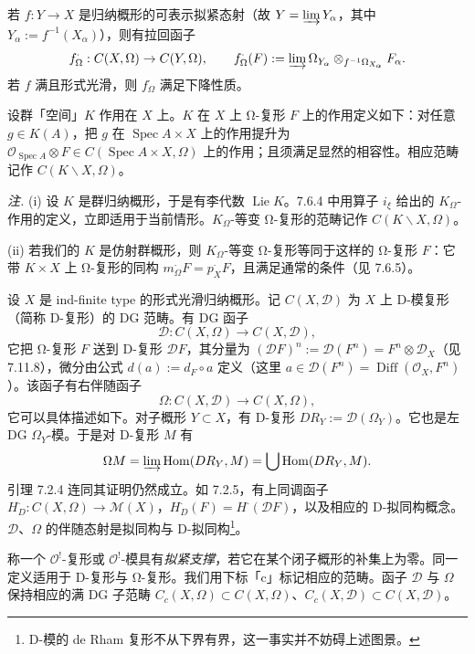 若 $f:Y\to X$ 是归纳概形的可表示拟紧态射（故 $Y=\varinjlim Y_\alpha$，其中 $Y_\alpha:=f^{-1}(X_\alpha)$），则有拉回函子
\[
f^\cdot_\Omega:C(X,\Omega)\to C(Y,\Omega),\qquad f^\cdot_\Omega(F):=\varinjlim\Omega_{Y_\alpha}\otimes_{f^{-1}\Omega_{X_\alpha}}F_\alpha.
\]
若 $f$ 满且形式光滑，则 $f^\cdot_\Omega$ 满足下降性质。

设群「空间」$K$ 作用在 $X$ 上。$K$ 在 $X$ 上 Ω-复形 $F$ 上的作用定义如下：对任意 $g\in K(A)$，把 $g$ 在 $\operatorname{Spec}A\times X$ 上的作用提升为 $\mathcal{O}_{\operatorname{Spec}A}\otimes F\in C(\operatorname{Spec}A\times X,\Omega)$ 上的作用；且须满足显然的相容性。相应范畴记作 $C(K\backslash X,\Omega)$。

\emph{注.} (i) 设 $K$ 是群归纳概形，于是有李代数 $\operatorname{Lie}K$。7.6.4 中用算子 $i_\xi$ 给出的 $K_\Omega$-作用的定义，立即适用于当前情形。$K_\Omega$-等变 Ω-复形的范畴记作 $C(K\backslash X,\Omega)$。


(ii) 若我们的 $K$ 是仿射群概形，则 $K_\Omega$-等变 Ω-复形等同于这样的 Ω-复形 $F$：它带 $K\times X$ 上 Ω-复形的同构 $m^\cdot_\Omega F=p^\cdot_X F$，且满足通常的条件（见 7.6.5）。

 设 $X$ 是 ind-finite type 的形式光滑归纳概形。记 $C(X,\mathcal{D})$ 为 $X$ 上 D-模复形（简称 D-复形）的 DG 范畴。有 DG 函子
\begin{equation}\tag{352}
\mathcal{D}:C(X,\Omega)\to C(X,\mathcal{D}),
\end{equation}
它把 Ω-复形 $F$ 送到 D-复形 $\mathcal{D}F$，其分量为 $(\mathcal{D}F)^n:=\mathcal{D}(F^n)=F^n\otimes\mathcal{D}_X$（见 7.11.8），微分由公式 $d(a):=d_F\circ a$ 定义（这里 $a\in\mathcal{D}(F^n)=\operatorname{Diff}(\mathcal{O}_X,F^n)$）。该函子有右伴随函子
\begin{equation}\tag{353}
\Omega:C(X,\mathcal{D})\to C(X,\Omega),
\end{equation}
它可以具体描述如下。对子概形 $Y\subset X$，有 D-复形 $DR_Y:=\mathcal{D}(\Omega_Y)$。它也是左 DG $\Omega_Y$-模。于是对 D-复形 $M$ 有
\[
\Omega M=\varinjlim\operatorname{Hom}(DR_Y,M)=\bigcup\operatorname{Hom}(DR_Y,M).
\]
引理 7.2.4 连同其证明仍然成立。如 7.2.5，有上同调函子 $H^\cdot_D:C(X,\Omega)\to\mathcal{M}(X)$，$H^\cdot_D(F)=H^\cdot(\mathcal{D}F)$，以及相应的 D-拟同构概念。$\mathcal{D}$、$\Omega$ 的伴随态射是拟同构与 D-拟同构\footnote{D-模的 de Rham 复形不从下界有界，这一事实并不妨碍上述图景。}。

 称一个 $\mathcal{O}^!$-复形或 $\mathcal{O}^!$-模具有\emph{拟紧支撑}，若它在某个闭子概形的补集上为零。同一定义适用于 D-复形与 Ω-复形。我们用下标「c」标记相应的范畴。函子 $\mathcal{D}$ 与 $\Omega$ 保持相应的满 DG 子范畴 $C_c(X,\Omega)\subset C(X,\Omega)$、$C_c(X,\mathcal{D})\subset C(X,\mathcal{D})$。

